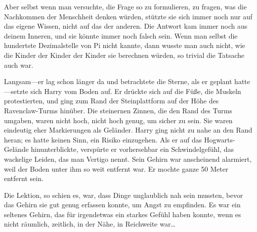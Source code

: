 Aber selbst wenn man versuchte, die Frage so zu formulieren, zu fragen, was die Nachkommen der Menschheit denken würden, stützte sie sich immer noch nur auf das eigene Wissen, nicht auf das der anderen. Die Antwort kam immer noch aus deinem Inneren, und sie könnte immer noch falsch sein. Wenn man selbst die hundertste Dezimalstelle von Pi nicht kannte, dann wusste man auch nicht, wie die Kinder der Kinder der Kinder sie berechnen würden, so trivial die Tatsache auch war.

\later

Langsam—er lag schon länger da und betrachtete die Sterne, als er geplant hatte—setzte sich Harry vom Boden auf. Er drückte sich auf die Füße, die Muskeln protestierten, und ging zum Rand der Steinplattform auf der Höhe des Ravenclaw-Turms hinüber. Die steinernen Zinnen, die den Rand des Turms umgaben, waren nicht hoch, nicht hoch genug, um sicher zu sein. Sie waren eindeutig eher Markierungen als Geländer. Harry ging nicht zu nahe an den Rand heran; es hatte keinen Sinn, ein Risiko einzugehen. Als er auf das Hogwarts-Gelände hinunterblickte, verspürte er vorhersehbar ein Schwindelgefühl, das wackelige Leiden, das man Vertigo nennt. Sein Gehirn war anscheinend alarmiert, weil der Boden unter ihm so weit entfernt war. Er mochte ganze 50 Meter entfernt sein.

Die Lektion, so schien es, war, dass Dinge unglaublich nah sein mussten, bevor das Gehirn sie gut genug erfassen konnte, um Angst zu empfinden.
Es war ein seltenes Gehirn, das für irgendetwas ein starkes Gefühl haben konnte, wenn es nicht räumlich, zeitlich, in der Nähe, in Reichweite war…


